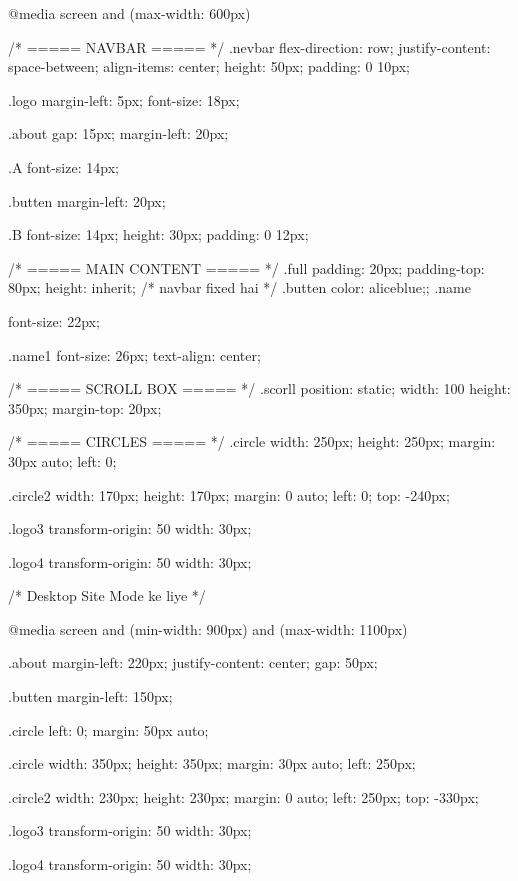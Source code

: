 @media screen and (max-width: 600px) {

  /* ===== NAVBAR ===== */
  .nevbar{
    flex-direction: row;
    justify-content: space-between;
    align-items: center;
    height: 50px;
    padding: 0 10px;
  }

  .logo{
    margin-left: 5px;
    font-size: 18px;
  }

  .about{
    gap: 15px;
    margin-left: 20px;
  }

  .A{
    font-size: 14px;
  }

  .butten{
    margin-left: 20px;
  }

  .B{
    font-size: 14px;
    height: 30px;
    padding: 0 12px;
  }

  /* ===== MAIN CONTENT ===== */
  .full{
    padding: 20px;
    padding-top: 80px;
    height: inherit; /* navbar fixed hai */
  }
.butten{
  color: aliceblue;;
}
  .name{
    font-size: 22px;
    
  }

  .name1{
    font-size: 26px;
    text-align: center;
  }

  /* ===== SCROLL BOX ===== */
  .scorll{
    position: static;
    width: 100%
    height: 350px;
    margin-top: 20px;
  }

  /* ===== CIRCLES ===== */
  .circle{
    width: 250px;
    height: 250px;
    margin: 30px auto;
    left: 0;
  }

  .circle2{
    width: 170px;
    height: 170px;
    margin: 0 auto;
    left: 0;
    top: -240px;
  }

  .logo3{
    transform-origin: 50%
    width: 30px;
  }

  .logo4{
    transform-origin: 50%
    width: 30px;
  }
}










/*  Desktop Site Mode ke liye */


@media screen and (min-width: 900px) and (max-width: 1100px) {

  .about{
    margin-left: 220px;
    justify-content: center;
    gap: 50px;
  }

  .butten{
    margin-left: 150px;
  }

  .circle{
    left: 0;
    margin: 50px auto;
  }

    .circle{
    width: 350px;
    height: 350px;
    margin: 30px auto;
    left: 250px;
  }

  .circle2{
    width: 230px;
    height: 230px;
    margin: 0 auto;
    left: 250px;
    top: -330px;
  }

  .logo3{
    transform-origin: 50%
    width: 30px;
  }

  .logo4{
    transform-origin: 50%
    width: 30px;
  }

 
}



